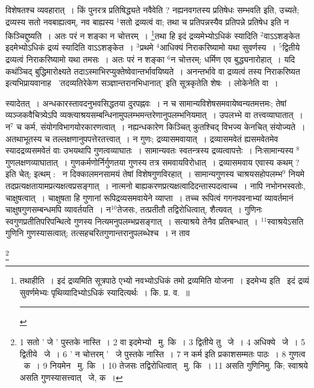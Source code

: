 \documentclass[11pt, openany]{book}
\newcommand\blfootnote[1]{%
 \begingroup
 \renewcommand\thefootnote{}\footnote{#1}%
 \addtocounter{footnote}{-1}%
 \endgroup
}
\begin{document}
\newpage
\noindent
विशेषतश्च व्यवहारात्~। किं पुनरत्र प्रतिषिद्ध्यते नवैवेति ? नह्यनवगतस्य प्रतिषेधः सम्भवति इति, उच्यते; द्रव्यस्य सतो नवबाह्यत्वम्, नव बाह्यस्य ${}^1$सतो द्रव्यत्वं वा; तथा च प्रतिपन्नस्यैव प्रतिपन्ने प्रतिषेध इति न किञ्चिद्दुष्यति~। अतः परं न शङ्का न चोत्तरम्~। \renewcommand{\thefootnote}{१}\footnote{तथाहीति~। इदं द्रव्यमिति सूत्रपाठे एभ्यो नवभ्योऽधिकं तमो द्रव्यमिति योजना~। इदमेभ्य इति \textendash\ इदं द्रव्यं सुवर्णमेभ्यः पृथिव्यादिभ्योऽधिकं स्यादित्यर्थः~। कि. प्र. व.~॥ \rule{0.4\linewidth}{0.5pt}}तथा हि इदं द्रव्यमेभ्योऽधिकं स्यादिति ${}^2$वाऽऽशङ्केत इदमेभ्योऽधिकं द्रव्यं स्यादिति वाऽऽशङ्केत~। ${}^3$प्रथमे ${}^4$आधिक्यं निराकरिष्यामो यथा सुवर्णस्य~। ${}^5$द्वितीये द्रव्यत्वं निराकरिष्यामो यथा तमसः~। अतः परं न शङ्का ${}^6$न चोत्तरम्; धर्मिण एव बुद्ध्यनारोहात्~। यदि कथंञ्चिद् बुद्धिमारोक्ष्यते तदाऽस्माभिरप्युक्तेष्वेवान्तर्भावयिष्यते~। अनन्तर्भावे वा द्रव्यत्वं तस्य निराकरिष्यत इत्यभिप्रायवानाह \textendash\ {\knu 'तदव्यतिरेकेण सञ्ज्ञान्तरानभिधानात्'} इति सूत्रकृतेति शेषः~। लोकेनेति वा~।

स्यादेतत्~। अन्धकारस्तावदनुभवसिद्धतया दुरपह्नवः~। न च सामान्यविशेषसमवायेष्वन्यतमत्तमः; तेषां व्यञ्जकवैचित्र्येऽपि व्यक्त्याश्रयसम्बन्धिनामुपलम्भमन्तरेणानुपलम्भनियमात्~। उपलभ्भे वा तत्त्वव्याघातात्~। न$^7$ च कर्म, संयोगविभागयोरकारणत्वात्~। नह्यन्धकारेण किञ्चित् कुतश्चिद् विभज्य केनचित् संयोज्यते~। अतथाभूतस्य च तल्लक्षणानुपपत्तेरतत्त्वात्~। न गुणः; द्रव्यासमवायात्~। द्रव्यासमवेतं ह्यसमवेतमेव स्यादद्रव्यसमवेतं वाः उभयथापि गुणत्वव्याघातः~। सामान्यवतः स्वतन्त्रस्य द्रव्यत्वापत्तेः~। निःसामान्यस्य ${}^8$गुणलक्षणव्याघातात्~। गुणकर्मणोर्निर्गुणतया गुणस्य तत्र समवायविरोधात्~। द्रव्यासमवाय एवास्य कथम् ? इति चेत्; इत्थम् : \textendash\ न दिक्कालमनसामयं तेषां विशेषगुणविरहात्~। सामान्यगुणस्य चाश्रयसहोपलम्भ$^9$ नियमे तदप्रत्यक्षतायामप्रत्यक्षत्वप्रसङ्गात्~। नात्मनो बाह्यकरणप्रत्यक्षत्वादिदन्तास्पदत्वाच्च~। नापि नभोनभस्वतोः, चाक्षुषत्वात्~। चाक्षुषता हि गुणानां रूपिद्रव्यसमवायेने व्याप्ता~। तच्च रूपित्वं गगनपवनाभ्यां व्यावर्तमानं चाक्षुषगुणसम्बन्धमपि व्यावर्तयति~। न${}^10$तेजसः, तत्प्रतीतौ तद्विरोधित्वात्, शैत्यवत्~। गुणिनः स्वगुणप्रतीतिपरिपन्थित्वे गुणस्य नित्यमनुपलम्भप्रसङ्गात्~। सत्याश्रये तेनैव प्रतिबन्धात्~। ${}^11$स्वाश्रयेऽसति गुणिनि गुणस्यासत्वात्; तत्सहचरितगुणान्तरानुपलब्धेश्च~। न ताव\textendash

\blfootnote{1 सतो ' जे ' पुस्तके नास्ति~। 2 वा इदमेभ्यो  \textendash\ मु. कि~। 3 द्वितीये तु  \textendash\ जे~। 4 अधिक्ये  \textendash\ जे~। 5 द्वितीये  \textendash\ जे~। 6 ' न चोत्तरम् ' \textendash\ जे पुस्तके नास्ति~। 7 न कर्म इति प्रकाशसम्मतः पाठः~। 8 गुणत्व  \textendash\ क~। 9 नियमेन  \textendash\ मु. कि~। 10 तेजसः तद्विरोधित्वात्  \textendash\ मु. कि~। 11 असति गुणिनिमु. कि; स्वाश्रये असति गुणस्यासत्त्वात्  \textendash\ जे, क~।}
\end{document}
